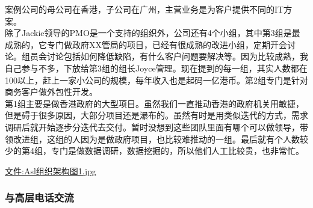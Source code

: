 案例公司的母公司在香港，子公司在广州，主营业务是为客户提供不同的IT方案。\\
除了Jackie领导的PMO是一个支持的组织外，公司还有4个小组，其中第3组是最成熟的，它专门做政府XX管局的项目，已经有很成熟的改进小组，定期开会讨论。组员会讨论包括如何降低缺陷，有什么客户问题要解决等。因为比较成熟，我自己参与不多，下放给第3组的组长Joyce管理。现在提到的每一组，其实人数都在100以上，赶上一家小公司的规模，每年收入也是起码一亿港币。第2组专门是针对商务客户做外包性开发。\\
第1组主要是做香港政府的大型项目。虽然我们一直推动香港的政府机关用敏捷，但是碍于很多原因，大部分项目还是瀑布的。虽然有时是用类似迭代的方式，需求调研后就开始逐步分迭代去交付。暂时没想到这些团队里面有哪个可以做领导，带领改进组，这组的人因为是做政府项目，也比较难推动的一组。最后就有个人数较少的第4组，专门是做数据调研，数据挖掘的，所以他们人工比较贵，也非常忙。

\url{文件:Asl组织架构图1.jpg}

\hypertarget{ux4e0eux9ad8ux5c42ux7535ux8bddux4ea4ux6d41}{%
\subsubsection{与高层电话交流}\label{ux4e0eux9ad8ux5c42ux7535ux8bddux4ea4ux6d41}}

